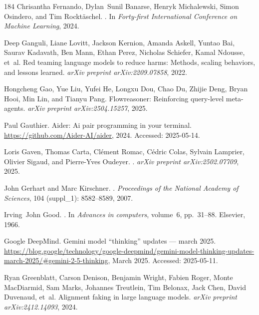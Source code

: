 \begin{thebibliography}{184}
Chrisantha Fernando, Dylan~Sunil Banarse, Henryk Michalewski, Simon Osindero,
  and Tim Rockt{\"a}schel.
.
\newblock In \emph{Forty-first International Conference on Machine Learning},
  2024.

Deep Ganguli, Liane Lovitt, Jackson Kernion, Amanda Askell, Yuntao Bai, Saurav
  Kadavath, Ben Mann, Ethan Perez, Nicholas Schiefer, Kamal Ndousse, et~al.
\newblock Red teaming language models to reduce harms: Methods, scaling
  behaviors, and lessons learned.
\newblock \emph{arXiv preprint arXiv:2209.07858}, 2022.

Hongcheng Gao, Yue Liu, Yufei He, Longxu Dou, Chao Du, Zhijie Deng, Bryan Hooi,
  Min Lin, and Tianyu Pang.
\newblock Flowreasoner: Reinforcing query-level meta-agents.
\newblock \emph{arXiv preprint arXiv:2504.15257}, 2025.

Paul Gauthier.
\newblock Aider: Ai pair programming in your terminal.
\newblock \url{https://github.com/Aider-AI/aider}, 2024.
\newblock Accessed: 2025-05-14.

Loris Gaven, Thomas Carta, Cl{\'e}ment Romac, C{\'e}dric Colas, Sylvain
  Lamprier, Olivier Sigaud, and Pierre-Yves Oudeyer.
.
\newblock \emph{arXiv preprint arXiv:2502.07709}, 2025.

John Gerhart and Marc Kirschner.
.
\newblock \emph{Proceedings of the National Academy of Sciences}, 104
  (suppl\_1): 8582--8589, 2007.

Irving~John Good.
.
\newblock In \emph{Advances in computers}, volume~6, pp.\  31--88. Elsevier,
  1966.

{Google DeepMind}.
\newblock Gemini model “thinking” updates — march 2025.
\newblock
  \url{https://blog.google/technology/google-deepmind/gemini-model-thinking-updates-march-2025/#gemini-2-5-thinking},
  March 2025.
\newblock Accessed: 2025-05-11.

Ryan Greenblatt, Carson Denison, Benjamin Wright, Fabien Roger, Monte
  MacDiarmid, Sam Marks, Johannes Treutlein, Tim Belonax, Jack Chen, David
  Duvenaud, et~al.
\newblock Alignment faking in large language models.
\newblock \emph{arXiv preprint arXiv:2412.14093}, 2024.


\end{thebibliography}
